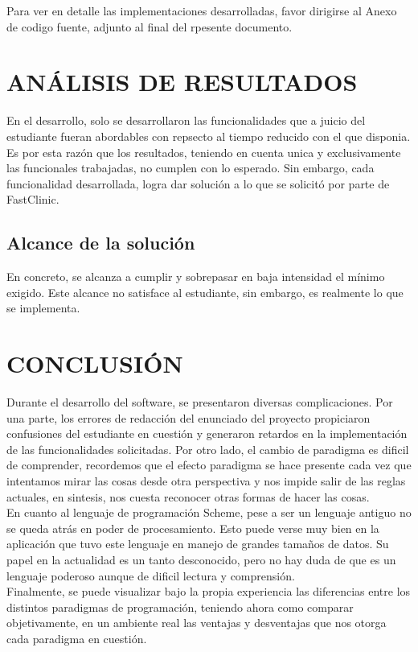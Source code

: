 \documentclass[12pt,letterpaper]{article}
\begin{document}
Para ver en detalle las implementaciones desarrolladas, favor dirigirse al Anexo de codigo fuente, adjunto al final del rpesente documento.
	
\section{ANÁLISIS DE RESULTADOS}
En el desarrollo, solo se desarrollaron las funcionalidades que a juicio del estudiante fueran abordables con repsecto al tiempo reducido con el que disponia. Es por esta razón que los resultados, teniendo en cuenta unica y exclusivamente las funcionales trabajadas, no cumplen con lo esperado. Sin embargo, cada funcionalidad desarrollada, logra dar solución a lo que se solicitó por parte de FastClinic. \\

	\subsection{Alcance de la solución}
	En concreto, se alcanza a cumplir y sobrepasar en baja intensidad el mínimo exigido. Este alcance no satisface al estudiante, sin embargo, es realmente lo que se implementa.

\newpage
\section{CONCLUSIÓN}
Durante el desarrollo del software, se presentaron diversas complicaciones. Por una parte, los errores de redacción del enunciado del proyecto propiciaron confusiones del estudiante en cuestión y generaron retardos en la implementación de las funcionalidades solicitadas. Por otro lado, el cambio de paradigma es dificil de comprender, recordemos que el efecto paradigma se hace presente cada vez que intentamos mirar las cosas desde otra perspectiva y nos impide salir de las reglas actuales, en sintesis, nos cuesta reconocer otras formas de hacer las cosas. \\

En cuanto al lenguaje de programación Scheme, pese a ser un lenguaje antiguo no se queda atrás en poder de procesamiento. Esto puede verse muy bien en la aplicación que tuvo este lenguaje en manejo de grandes tamaños de datos. Su papel en la actualidad es un tanto desconocido, pero no hay duda de que es un lenguaje poderoso aunque de dificil lectura y comprensión. \\

Finalmente, se puede visualizar bajo la propia experiencia las diferencias entre los distintos paradigmas de programación, teniendo ahora como comparar objetivamente, en un ambiente real las ventajas y desventajas que nos otorga cada paradigma en cuestión.
\end{document}
